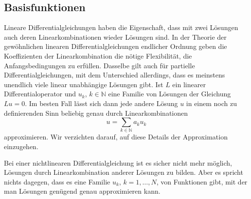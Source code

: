 \subsection{Basisfunktionen}
Lineare Differentialgleichungen haben die Eigenschaft, dass 
mit zwei Lösungen auch deren Linear\-kombinationen wieder Lösungen sind.
In der Theorie der gewöhnlichen linearen Differentialgleichungen endlicher
Ordnung geben die Koeffizienten der Linearkombination die nötige Flexibilität,
die Anfangsbedingungen zu erfüllen.
Dasselbe gilt auch für partielle Differentialgleichungen, mit dem Unterschied
allerdings, dass es meinstens unendlich viele linear unabhängige Lösungen
gibt.
Ist $L$ ein linearer Differentialoperator und $u_k$, $k\in\mathbb N$ eine
Familie von Lösungen der Gleichung $Lu=0$.
Im besten Fall lässt sich dann jede andere Lösung $u$ in einem noch
zu definierenden Sinn beliebig genau durch Linearkombinationen
\[
u=\sum_{k\in\mathbb N} a_ku_k
\]
approximieren.
Wir verzichten darauf, auf diese Details der Approximation einzugehen.

Bei einer nichtlinearen Differentialgleichung ist es sicher nicht
mehr möglich, Lösungen durch Linearkombination anderer Lösungen
zu bilden.
Aber es spricht nichts dagegen, dass es eine Familie $u_k$, $k=1,\dots,N$,
von Funktionen gibt, mit der man Lösungen genügend genau approximieren
kann.

